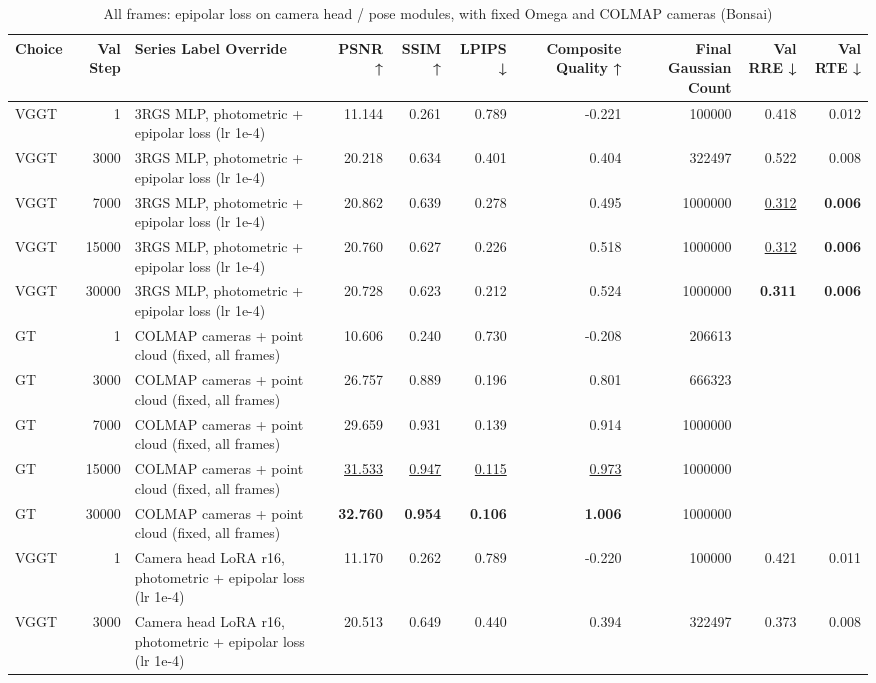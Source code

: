 \begin{table}[H]
\caption{\ifdefined\customcaption \customcaption \else All frames: epipolar loss on camera head / pose modules, with fixed Omega and COLMAP cameras (Bonsai) \fi}
\label{tab:116_omega_epi_all_vs_fixed_bonsai}
\centering
\tiny
\begin{tabular}{lrlrrrrrrr}
\toprule
Choice & Val Step & Series Label Override & PSNR ↑ & SSIM ↑ & LPIPS ↓ & Composite Quality ↑ & Final Gaussian Count & Val RRE ↓ & Val RTE ↓ \\
\midrule
VGGT & 1 & 3RGS MLP, photometric + epipolar loss (lr 1e-4) & 11.144 & 0.261 & 0.789 & -0.221 & 100000 & 0.418 & 0.012 \\
VGGT & 3000 & 3RGS MLP, photometric + epipolar loss (lr 1e-4) & 20.218 & 0.634 & 0.401 & 0.404 & 322497 & 0.522 & 0.008 \\
VGGT & 7000 & 3RGS MLP, photometric + epipolar loss (lr 1e-4) & 20.862 & 0.639 & 0.278 & 0.495 & 1000000 & \underline{0.312} & \textbf{0.006} \\
VGGT & 15000 & 3RGS MLP, photometric + epipolar loss (lr 1e-4) & 20.760 & 0.627 & 0.226 & 0.518 & 1000000 & \underline{0.312} & \textbf{0.006} \\
VGGT & 30000 & 3RGS MLP, photometric + epipolar loss (lr 1e-4) & 20.728 & 0.623 & 0.212 & 0.524 & 1000000 & \textbf{0.311} & \textbf{0.006} \\
GT & 1 & COLMAP cameras + point cloud (fixed, all frames) & 10.606 & 0.240 & 0.730 & -0.208 & 206613 &  &  \\
GT & 3000 & COLMAP cameras + point cloud (fixed, all frames) & 26.757 & 0.889 & 0.196 & 0.801 & 666323 &  &  \\
GT & 7000 & COLMAP cameras + point cloud (fixed, all frames) & 29.659 & 0.931 & 0.139 & 0.914 & 1000000 &  &  \\
GT & 15000 & COLMAP cameras + point cloud (fixed, all frames) & \underline{31.533} & \underline{0.947} & \underline{0.115} & \underline{0.973} & 1000000 &  &  \\
GT & 30000 & COLMAP cameras + point cloud (fixed, all frames) & \textbf{32.760} & \textbf{0.954} & \textbf{0.106} & \textbf{1.006} & 1000000 &  &  \\
VGGT & 1 & Camera head LoRA r16, photometric + epipolar loss (lr 1e-4) & 11.170 & 0.262 & 0.789 & -0.220 & 100000 & 0.421 & 0.011 \\
VGGT & 3000 & Camera head LoRA r16, photometric + epipolar loss (lr 1e-4) & 20.513 & 0.649 & 0.440 & 0.394 & 322497 & 0.373 & 0.008 \\

\end{tabular}
\end{table}
